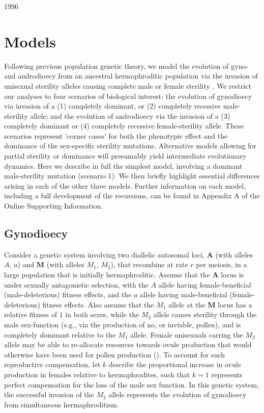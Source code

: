1996\documentclass[9pt,twocolumn,twoside,lineno]{gsajnl}
\begin{document}
\section{Models} \label{sec:methods}

Following previous population genetic theory, we model the evolution of gyno- and androdioecy from an ancestral hermaphroditic population via the invasion of unisexual sterility alleles causing complete male or female sterility \citep{Charlesworth1978a}. We restrict our analyses to four scenarios of biological interest: the evolution of gynodioecy via invasion of a (1) completely dominant, or (2) completely recessive male-sterility allele; and the evolution of androdioecy via the invasion of a (3) completely dominant or (4) completely recessive female-sterility allele. These scenarios represent 'corner cases' for both the phenotypic effect and the dominance of the sex-specific sterility mutations. Alternative models allowing for partial sterility or dominance will presumably yield intermediate evolutionary dynamics. Here we describe in full the simplest model, involving a dominant male-sterility mutation (scenario 1). We then briefly highlight essential differences arising in each of the other three models. Further information on each model, including a full development of the recursions, can be found in Appendix A of the Online Supporting Information.

\subsection{Gynodioecy}

Consider a genetic system involving two diallelic autosomal loci, $\mathbf{A}$ (with alleles $A$, $a$) and $\mathbf{M}$ (with alleles $M_1$, $M_2$), that recombine at rate $r$ per meiosis, in a large population that is initially hermaphroditic. Assume that the $\mathbf{A}$ locus is under sexually antagonistic selection, with the $A$ allele having female-beneficial (male-deleterious) fitness effects, and the $a$ allele having male-beneficial (female-deleterious) fitness effects. Also assume that the $M_1$ allele at the $\mathbf{M}$ locus has a relative fitness of $1$ in both sexes, while the $M_2$ allele causes sterility through the male sex-function (e.g., via the production of no, or inviable, pollen), and is completely dominant relative to the $M_1$ allele. Female unisexuals carring the $M_2$ allele may be able to re-allocate resources towards ovule production that would otherwise have been used for pollen production (\citealt{Lloyd1975,Lloyd1976,Charlesworth1978a}). To account for such reproductive compensation, let $k$ describe the proportional increase in ovule production in females relative to hermaphrodites, such that $k = 1$ represents perfect compensation for the loss of the male sex function. In this genetic system, the successful invasion of the $M_2$ allele represents the evolution of gynodioecy from simultaneous hermaphroditism. 
\end{document}
